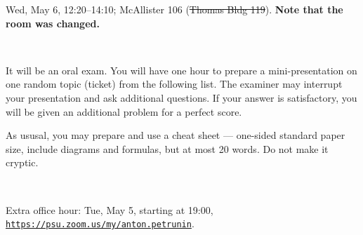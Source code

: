 Wed, May 6, 12:20--14:10; McAllister 106 (\sout{Thomas Bldg 119}).
\textbf{Note that the room was changed.}

\

It will be an oral exam.
You will have one hour to prepare a mini-presentation on one random topic (ticket) from the following list.
The examiner may interrupt your presentation and ask additional questions.
If your answer is satisfactory, you will be given an additional problem for a perfect score.

As ususal, you may prepare and use a cheat sheet --- one-sided standard paper size, include diagrams and formulas, but at most 20 words.
Do not make it cryptic.

\

Extra office hour: Tue, May 5, starting at 19:00,\\ \href{https://psu.zoom.us/my/anton.petrunin}{\texttt{https://psu.zoom.us/my/anton.petrunin}}.

\

